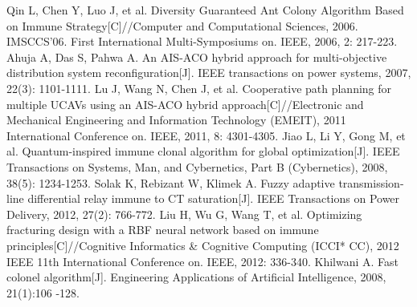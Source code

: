 \documentclass[11pt,a4paper,oldfontcommands]{memoir}
\begin{document}
\begin{thebibliography}{}
Qin L, Chen Y, Luo J, et al. Diversity Guaranteed Ant Colony Algorithm Based on Immune Strategy[C]//Computer and Computational Sciences, 2006. IMSCCS'06. First International Multi-Symposiums on. IEEE, 2006, 2: 217-223.
Ahuja A, Das S, Pahwa A. An AIS-ACO hybrid approach for multi-objective distribution system reconfiguration[J]. IEEE transactions on power systems, 2007, 22(3): 1101-1111.
Lu J, Wang N, Chen J, et al. Cooperative path planning for multiple UCAVs using an AIS-ACO hybrid approach[C]//Electronic and Mechanical Engineering and Information Technology (EMEIT), 2011 International Conference on. IEEE, 2011, 8: 4301-4305.
Jiao L, Li Y, Gong M, et al. Quantum-inspired immune clonal algorithm for global optimization[J]. IEEE Transactions on Systems, Man, and Cybernetics, Part B (Cybernetics), 2008, 38(5): 1234-1253.
Solak K, Rebizant W, Klimek A. Fuzzy adaptive transmission-line differential relay immune to CT saturation[J]. IEEE Transactions on Power Delivery, 2012, 27(2): 766-772.
Liu H, Wu G, Wang T, et al. Optimizing fracturing design with a RBF neural network based on immune principles[C]//Cognitive Informatics \& Cognitive Computing (ICCI* CC), 2012 IEEE 11th International Conference on. IEEE, 2012: 336-340.
Khilwani A. Fast colonel algorithm[J]. Engineering Applications of Artificial Intelligence, 2008, 21(1):106 -128.
\end{thebibliography}
\end{document}
